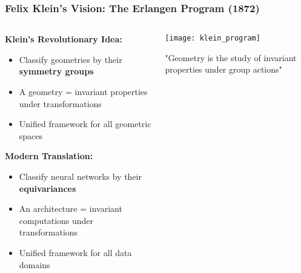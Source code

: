 \begin{frame}[fragile]\frametitle{Felix Klein's Vision: The Erlangen Program (1872)}

\begin{columns}
\begin{column}{0.6\textwidth}
\textbf{Klein's Revolutionary Idea:}
\begin{itemize}
\item Classify geometries by their \textbf{symmetry groups}
\item A geometry = invariant properties under transformations
\item Unified framework for all geometric spaces
\end{itemize}

\vspace{0.5cm}
\textbf{Modern Translation:}
\begin{itemize}
\item Classify neural networks by their \textbf{equivariances}
\item An architecture = invariant computations under transformations  
\item Unified framework for all data domains
\end{itemize}
\end{column}
\begin{column}{0.4\textwidth}
\begin{center}
\texttt{[image: klein\_program]}

\vspace{0.5cm}
{\small "Geometry is the study of invariant properties under group actions"}
\end{center}
\end{column}
\end{columns}

\end{frame}

